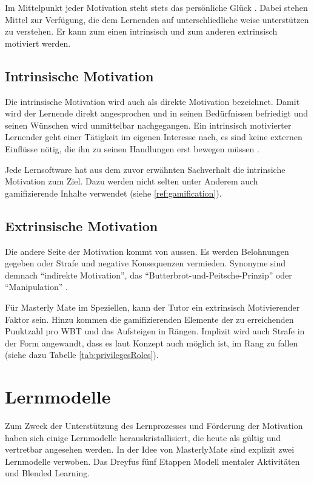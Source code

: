 Im Mittelpunkt jeder Motivation steht stets das persönliche Glück
\cite{stampfl:2012}. Dabei stehen Mittel zur Verfügung, die dem Lernenden auf
unterschliedliche weise unterstützen zu verstehen. Er kann zum einen
intrinsisch und zum anderen extrinsisch motiviert werden.

\subsection{Intrinsische Motivation}
Die intrinsische Motivation wird auch als direkte Motivation bezeichnet. Damit
wird der Lernende direkt angesprochen und in seinen Bedürfnissen befriedigt und
seinen Wünschen wird unmittelbar nachgegangen. Ein intrinsisch motivierter
Lernender geht einer Tätigkeit im eigenen Interesse nach, es sind keine externen
Einflüsse nötig, die ihn zu seinen Handlungen erst bewegen müssen
\cite{jacobs:2010}.

Jede Lernsoftware hat aus dem zuvor erwähnten Sachverhalt die intrinsiche
Motivation zum Ziel. Dazu werden nicht selten unter Anderem auch gamifizierende
Inhalte verwendet (siehe \ref{ref:gamification}).

\subsection{Extrinsische Motivation}
Die andere Seite der Motivation kommt von aussen. Es werden Belohnungen gegeben
oder Strafe und negative Konsequenzen vermieden. Synonyme sind demnach
"`indirekte Motivation"', das "`Butterbrot-und-Peitsche-Prinzip"' oder
"`Manipulation"' \cite{jacobs:2010}.

Für Masterly Mate im Speziellen, kann der Tutor ein extrinsisch Motivierender
Faktor sein. Hinzu kommen die gamifizierenden Elemente der zu erreichenden
Punktzahl pro WBT und das Aufsteigen in Rängen. Implizit wird auch Strafe in der
Form angewandt, dass es laut Konzept auch möglich ist, im Rang zu fallen
(siehe dazu Tabelle \ref{tab:privilegesRoles}).

\section{Lernmodelle}
Zum Zweck der Unterstützung des Lernprozesses und Förderung der Motivation haben
sich einige Lernmodelle herauskristallisiert, die heute als gültig und
vertretbar angesehen werden. In der Idee von MasterlyMate sind explizit zwei
Lernmodelle verwoben. Das Dreyfus fünf Etappen Modell mentaler Aktivitäten und
Blended Learning.

